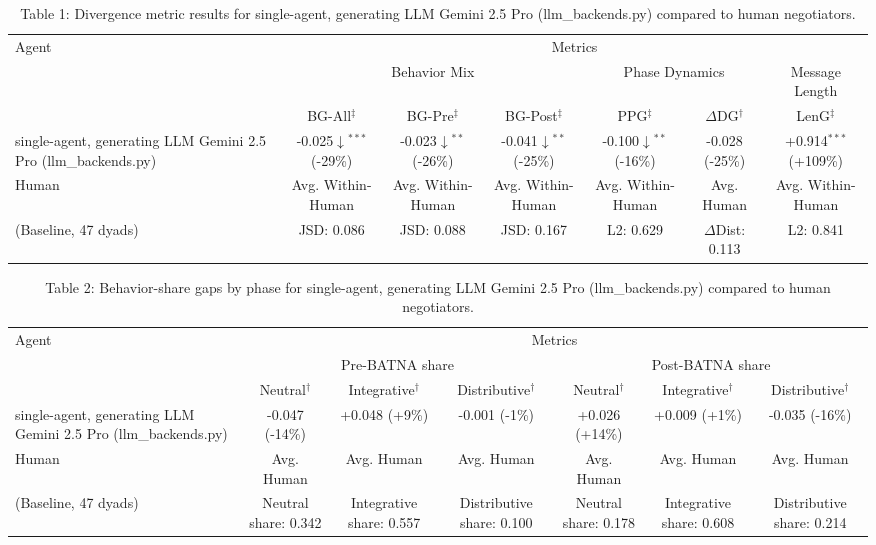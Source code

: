 \begin{table}[t]
\centering
\begin{tabular}{lcccccc}
\toprule
\multirow{3}{*}{Agent} & \multicolumn{6}{c}{Metrics} \\
\cmidrule(lr){2-7}
 & \multicolumn{3}{c}{Behavior Mix} & \multicolumn{2}{c}{Phase Dynamics} & \multicolumn{1}{c}{Message Length} \\
\cmidrule(lr){2-4} \cmidrule(lr){5-6} \cmidrule(lr){7-7}
 & BG-All$^\ddagger$ & BG-Pre$^\ddagger$ & BG-Post$^\ddagger$ & PPG$^\ddagger$ & $\Delta$DG$^\dagger$ & LenG$^\ddagger$ \\
\midrule
single-agent, generating LLM Gemini 2.5 Pro (llm_backends.py) & -0.025$\downarrow$$^{***}$ (-29\%) & -0.023$\downarrow$$^{**}$ (-26\%) & -0.041$\downarrow$$^{**}$ (-25\%) & -0.100$\downarrow$$^{**}$ (-16\%) & -0.028 (-25\%) & +0.914$^{***}$ (+109\%) \\
\midrule
Human & Avg. Within-Human & Avg. Within-Human & Avg. Within-Human & Avg. Within-Human & Avg. Human & Avg. Within-Human \\
(Baseline, 47 dyads) & JSD: 0.086 & JSD: 0.088 & JSD: 0.167 & L2: 0.629 & $\Delta$Dist: 0.113 & L2: 0.841 \\
\bottomrule
\end{tabular}
\caption{Table 1: Divergence metric results for single-agent, generating LLM Gemini 2.5 Pro (llm_backends.py) compared to human negotiators.}
\end{table}

\begin{table}[t]
\centering
\begin{tabular}{lcccccc}
\toprule
\multirow{3}{*}{Agent} & \multicolumn{6}{c}{Metrics} \\
\cmidrule(lr){2-7}
 & \multicolumn{3}{c}{Pre-BATNA share} & \multicolumn{3}{c}{Post-BATNA share} \\
\cmidrule(lr){2-4} \cmidrule(lr){5-7}
 & Neutral$^\dagger$ & Integrative$^\dagger$ & Distributive$^\dagger$ & Neutral$^\dagger$ & Integrative$^\dagger$ & Distributive$^\dagger$ \\
\midrule
single-agent, generating LLM Gemini 2.5 Pro (llm_backends.py) & -0.047 (-14\%) & +0.048 (+9\%) & -0.001 (-1\%) & +0.026 (+14\%) & +0.009 (+1\%) & -0.035 (-16\%) \\
\midrule
Human & Avg. Human & Avg. Human & Avg. Human & Avg. Human & Avg. Human & Avg. Human \\
(Baseline, 47 dyads) & Neutral share: 0.342 & Integrative share: 0.557 & Distributive share: 0.100 & Neutral share: 0.178 & Integrative share: 0.608 & Distributive share: 0.214 \\
\bottomrule
\end{tabular}
\caption{Table 2: Behavior-share gaps by phase for single-agent, generating LLM Gemini 2.5 Pro (llm_backends.py) compared to human negotiators.}
\end{table}
